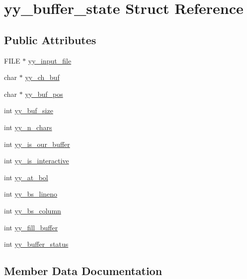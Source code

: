 \hypertarget{structyy__buffer__state}{}\section{yy\+\_\+buffer\+\_\+state Struct Reference}
\label{structyy__buffer__state}
\subsection*{Public Attributes}
\begin{DoxyCompactItemize}
\item 
F\+I\+LE $\ast$ \hyperlink{structyy__buffer__state_a4843d1422e3276b636d475a3095bd948}{yy\+\_\+input\+\_\+file}
\item 
char $\ast$ \hyperlink{structyy__buffer__state_ad7b8df8d8a4688e57b0b8d3ca75adc85}{yy\+\_\+ch\+\_\+buf}
\item 
char $\ast$ \hyperlink{structyy__buffer__state_a58aa927f098b99d99e75da80f9b681ef}{yy\+\_\+buf\+\_\+pos}
\item 
int \hyperlink{structyy__buffer__state_a451d39697f006f3922c1f43cf79286b4}{yy\+\_\+buf\+\_\+size}
\item 
int \hyperlink{structyy__buffer__state_a06406208824817acfec2183b79080945}{yy\+\_\+n\+\_\+chars}
\item 
int \hyperlink{structyy__buffer__state_a80ce2431c70dc4f89ced487f18449465}{yy\+\_\+is\+\_\+our\+\_\+buffer}
\item 
int \hyperlink{structyy__buffer__state_abf5c70eea75581b58c0ee7bd31b14490}{yy\+\_\+is\+\_\+interactive}
\item 
int \hyperlink{structyy__buffer__state_a9d60c60af6e1a6f69de16871fd64f85f}{yy\+\_\+at\+\_\+bol}
\item 
int \hyperlink{structyy__buffer__state_a818e94bc9c766e683c60df1e9fd01199}{yy\+\_\+bs\+\_\+lineno}
\item 
int \hyperlink{structyy__buffer__state_a10c4fcd8be759e6bf11e6d3e8cdb0307}{yy\+\_\+bs\+\_\+column}
\item 
int \hyperlink{structyy__buffer__state_a63d2afbb1d79a3fc63df9e12626f827d}{yy\+\_\+fill\+\_\+buffer}
\item 
int \hyperlink{structyy__buffer__state_a70fd925d37a2f0454fbd0def675d106c}{yy\+\_\+buffer\+\_\+status}
\end{DoxyCompactItemize}


\subsection{Member Data Documentation}
